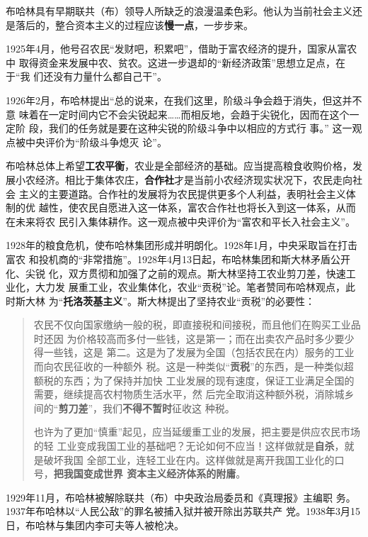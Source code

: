 \begin{enumerate}
  布哈林具有早期联共（布）领导人所缺乏的浪漫温柔色彩。他认为当前社会主义还
  是落后的，整合资本主义的过程应该\textbf{慢一点}，一步步来。

  1925年4月，他号召农民“发财吧，积累吧”，借助于富农经济的提升，国家从富农中
  取得资金来发展中农、贫农。这进一步退却的“新经济政策”思想立足点，在于“我
  们还没有力量什么都自己干”。

  1926年2月，布哈林提出“总的说来，在我们这里，阶级斗争会趋于消失，但这并不意
  味着在一定时间内它不会尖锐起来……而相反地，会趋于尖锐化，因而在这个一定阶
  段，我们的任务就是要在这种尖锐的阶级斗争中以相应的方式行
  事。” 这一观点被中央评价为“阶级斗争熄灭
  论”。

  布哈林总体上希望\textbf{工农平衡}，农业是全部经济的基础。应当提高粮食收购价格，发
  展小农经济。相比于集体农庄，\textbf{合作社}才是当前小农经济现实状况下，农民走向社会
  主义的主要道路。合作社的发展将为农民提供更多个人利益，表明社会主义体制的优
  越性，使农民自愿进入这一体系，富农合作社也将长入到这一体系，从而在未来将农
  民引入集体耕作。这一观点被中央评价为“富农和平长入社会主义”。

  1928年的粮食危机，使布哈林集团形成并明朗化。1928年1月，中央采取旨在打击富农
  和投机商的“非常措施”。1928年4月13日起，布哈林集团和斯大林矛盾公开化、尖锐
  化，双方贯彻和加强了之前的观点。斯大林坚持工农业剪刀差，快速工业化，大力发
  展重工业，农业集体化，农业“贡税”论。笔者赞同布哈林观点，此时斯大林
  为“\textbf{托洛茨基主义}”。斯大林提出了坚持农业“贡税”的必要性：
  \begin{quotation}
    农民不仅向国家缴纳一般的税，即直接税和间接税，而且他们在购买工业品时还因
    为价格较高而多付一些钱，这是第一；而在出卖农产品时多少要少得一些钱，这是
    第二。这是为了发展为全国（包括农民在内）服务的工业而向农民征收的一种额外
    税。这是一种类似“\textbf{贡税}”的东西，是一种类似超额税的东西；为了保持并加快
    工业发展的现有速度，保证工业满足全国的需要，继续提高农村物质生活水平，然
    后完全取消这种额外税，消除城乡间的“\textbf{剪刀差}”，我们\textbf{不得不暂时}征收这
    种税。

    也许为了更加“慎重”起见，应当延缓重工业的发展，把主要是供应农民市场的轻
    工业变成我国工业的基础吧？无论如何不应当！这样做就是\textbf{自杀}，就是破坏我国
    全部工业，连轻工业在内。这样做就是离开我国工业化的口号，\textbf{把我国变成世界
      资本主义经济体系的附庸}。
  \end{quotation}

  1929年11月，布哈林被解除联共（布）中央政治局委员和《真理报》主编职
  务。1937年布哈林以“人民公敌”的罪名被捕入狱并被开除出苏联共产
  党。1938年3月15日，布哈林与集团内李可夫等人被枪决。

\end{enumerate}


